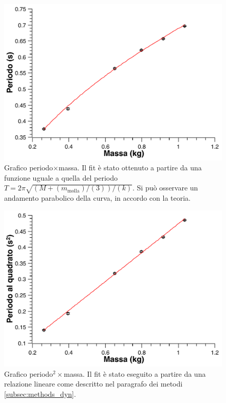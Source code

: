 \documentclass[italian, a4paper, 10pt, twocolumn]{../../style/lab_unige}
\begin{document}
{    \begin{figure}
        \centering
        \includegraphics[width=\linewidth]{plot_dyn.pdf}
        \caption{Grafico periodo$\times$massa. Il fit è stato ottenuto a partire da una funzione uguale a quella
        del periodo $T = 2 \pi \sqrt{\left(M+(m_{\text{molla}})/(3)\right)/\left(k\right)}$. Si può osservare un 
        andamento parabolico della curva, in accordo con la teoria.}
        \label{figure:plot_dyn}
    \end{figure}

    \begin{figure}
        \centering
        \includegraphics[width=\linewidth]{plot_dyn_lin.pdf}
        \caption{Grafico periodo$^2\times$massa. Il fit è stato eseguito a partire da una relazione lineare come 
        descritto nel paragrafo dei metodi \ref{subsec:methods_dyn}.}
        \label{figure:plot_dyn_lin}
    \end{figure}

}
\end{document}
